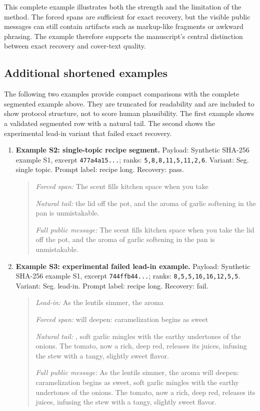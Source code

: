 \documentclass[fleqn,10pt]{wlscirep}
\begin{document}
This complete example illustrates both the strength and the limitation of the method. The forced spans are sufficient for exact recovery, but the visible public messages can still contain artifacts such as markup-like fragments or awkward phrasing. The example therefore supports the manuscript's central distinction between exact recovery and cover-text quality.

\subsection*{Additional shortened examples}

The following two examples provide compact comparisons with the complete segmented example above. They are truncated for readability and are included to show protocol structure, not to score human plausibility. The first example shows a validated segmented row with a natural tail. The second shows the experimental lead-in variant that failed exact recovery.

\begin{enumerate}
\item \textbf{Example S2: single-topic recipe segment.} Payload: Synthetic SHA-256 example S1, excerpt \texttt{477a4a15...}; ranks: \texttt{5,8,8,11,5,11,2,6}. Variant: Seg. single topic. Prompt label: recipe long. Recovery: pass.

\begin{quote}
\small
\textit{Forced span:} The scent fills kitchen space when you take\par\smallskip
\textit{Natural tail:} the lid off the pot, and the aroma of garlic softening in the pan is unmistakable.\par\smallskip
\textit{Full public message:} The scent fills kitchen space when you take the lid off the pot, and the aroma of garlic softening in the pan is unmistakable.
\end{quote}

\item \textbf{Example S3: experimental failed lead-in example.} Payload: Synthetic SHA-256 example S1, excerpt \texttt{744ffb44...}; ranks: \texttt{8,5,5,16,16,12,5,5}. Variant: Seg. lead-in. Prompt label: recipe long. Recovery: fail.

\begin{quote}
\small
\textit{Lead-in:} As the lentils simmer, the aroma\par\smallskip
\textit{Forced span:} will deepen: caramelization begins as sweet\par\smallskip
\textit{Natural tail:} , soft garlic mingles with the earthy undertones of the onions. The tomato, now a rich, deep red, releases its juices, infusing the stew with a tangy, slightly sweet flavor.\par\smallskip
\textit{Full public message:} As the lentils simmer, the aroma will deepen: caramelization begins as sweet, soft garlic mingles with the earthy undertones of the onions. The tomato, now a rich, deep red, releases its juices, infusing the stew with a tangy, slightly sweet flavor.
\end{quote}
\end{enumerate}
\end{document}
